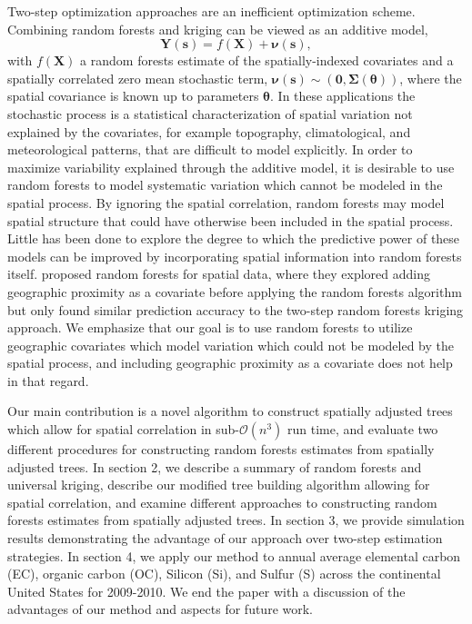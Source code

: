 \documentclass[12pt]{article}
\newcommand{\proc}{\mathbf{Y}(\mathbf{s})}
\newcommand{\covs}{\mathbf{X}}
\newcommand{\spproc}{\boldsymbol{\nu}(\mathbf{s})}
\newcommand{\pars}{\boldsymbol{\theta}}
\newcommand{\Sig}{\boldsymbol{\Sigma}}
\begin{document}
Two-step optimization approaches are an inefficient optimization scheme.  Combining random forests and kriging can be viewed as an additive model,
$$\proc =  f(\covs) + \spproc,$$
with $f \left( \covs \right)$ a random forests estimate of the spatially-indexed covariates and a spatially correlated zero mean stochastic term, $\spproc \sim (\mathbf{0}, \Sig( \pars ))$, where the spatial covariance is known up to parameters $\pars$. In these applications the stochastic process is a statistical characterization of spatial variation not explained by the covariates, for example topography, climatological, and meteorological patterns, that are difficult to model explicitly. In order to maximize variability explained through the additive model, it is desirable to use random forests to model systematic variation which cannot be modeled in the spatial process. By ignoring the spatial correlation, random forests may model spatial structure that could have otherwise been included in the spatial process. Little has been done to explore the degree to which the predictive power of these models can be improved by incorporating spatial information into random forests itself. \cite{hengl2018random} proposed random forests for spatial data, where they explored adding geographic proximity as a covariate before applying the random forests algorithm but only found similar prediction accuracy to the two-step random forests kriging approach. We emphasize that our goal is to use random forests to utilize geographic covariates which model variation which could not be modeled by the spatial process, and including geographic proximity as a covariate does not help in that regard.

Our main contribution is a novel algorithm to construct spatially adjusted trees which allow for spatial correlation in sub-$\mathcal{O}(n^3)$ run time, and evaluate two different procedures for constructing random forests estimates from spatially adjusted trees. In section 2, we describe a summary of random forests and universal kriging, describe our modified tree building algorithm allowing for spatial correlation, and examine different approaches to constructing random forests estimates from spatially adjusted trees. In section 3, we provide simulation results demonstrating the advantage of our approach over two-step estimation strategies. In section 4, we apply our method to annual average elemental carbon (EC), organic carbon (OC), Silicon (Si), and Sulfur (S) across the continental United States for 2009-2010. We end the paper with a discussion of the advantages of our method and aspects for future work.
\end{document}
